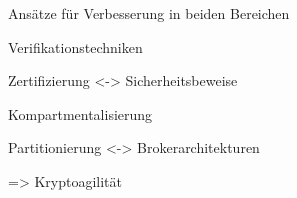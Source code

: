 
\begin{frame}[c]{Ansätze für Verbesserung in beiden Bereichen}

  Verifikationstechniken
  \vspace{0.5em}

  {\footnotesize Zertifizierung <-> Sicherheitsbeweise}
  \vspace{1.5em}

  Kompartmentalisierung
  \vspace{0.5em}

  {\footnotesize Partitionierung <-> Brokerarchitekturen}
  \vspace{1.5em}


  => Kryptoagilität
\end{frame}
